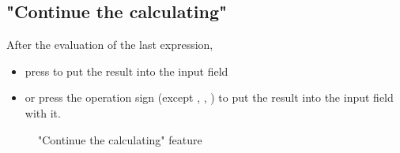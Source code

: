 \documentclass[a5paper, 11pt]{article}
\begin{document}
    \subsection{"Continue the calculating"}
        After the evaluation of the last expression,
        \begin{itemize}
            \item press \keys{=} to put the result into the input field
            \item or press the operation sign (except , , ) to put the result into the input field with it.
        \end{itemize}
        \begin{figure}
            \centering
            \caption{"Continue the calculating" feature}
            \label{pic:continue_the_calculating01}
        \end{figure}
\end{document}

